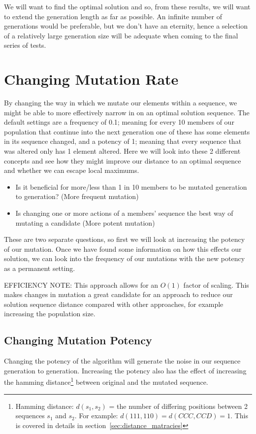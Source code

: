 We will want to find the optimal solution and so, from these results, we will want to extend the generation length as far as possible.
An infinite number of generations would be preferable, but we don't have an eternity, hence a selection of a relatively large generation size will be adequate when coming to the final series of tests.

\section{Changing Mutation Rate}\label{sec:changeingmutationrate}
By changing the way in which we mutate our elements within a sequence, we might be able to more effectively narrow in on an optimal solution sequence.
The default settings are a frequency of 0.1; meaning for every 10 members of our population that continue into the next generation one of these has some elements in its sequence changed, and a potency of 1;
meaning that every sequence that was altered only has 1 element altered.
Here we will look into these 2 different concepts and see how they might improve our distance to an optimal sequence and whether we can escape local maximums.
\begin{itemize}
    \item Is it beneficial for more/less than 1 in 10 members to be mutated generation to generation? (More frequent mutation)
    \item Is changing one or more actions of a members' sequence the best way of mutating a candidate (More potent mutation)
\end{itemize}

These are two separate questions, so first we will look at increasing the potency of our mutation.
Once we have found some information on how this effects our solution, we can look into the frequency of our mutations with the new potency as a permanent setting.

EFFICIENCY NOTE\@: This approach allows for an \(O(1)\) factor of scaling.
This makes changes in mutation a great candidate for an approach to reduce our solution sequence distance compared with other approaches, for example increasing the population size.

\subsection{Changing Mutation Potency}\label{subsec:changingMutationPotency}
Changing the potency of the algorithm will generate the noise in our sequence generation to generation.
Increasing the potency also has the effect of increasing the hamming distance\footnote{Hamming distance: \(d(s_1,s_2)\) = the number of differing positions between 2 sequences \(s_1\) and \(s_2\).
For example: \(d(111,110) = d(CCC,CCD) = 1 \). This is covered in details in section~\ref{sec:distance_matracies}} between original and the mutated sequence.

